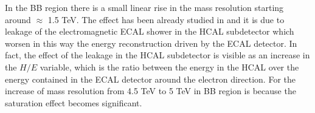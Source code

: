 
%

In the BB region there is a small linear rise in the mass resolution starting around $\approx$ 1.5 TeV. The effect has been already studied in \cite{CMS-AN-2015-222} and it is due to leakage of the electromagnetic ECAL shower in the HCAL subdetector which worsen in this way the energy reconstruction driven by the ECAL detector.
In fact, the effect of the leakage in the HCAL subdetector is visible as an increase in the $H/E$ variable, which is the ratio between the energy in the HCAL over the energy contained in the ECAL detector around the electron direction. For the increase of mass resolution from 4.5 TeV to 5 TeV in BB region is because the saturation effect becomes significant.


